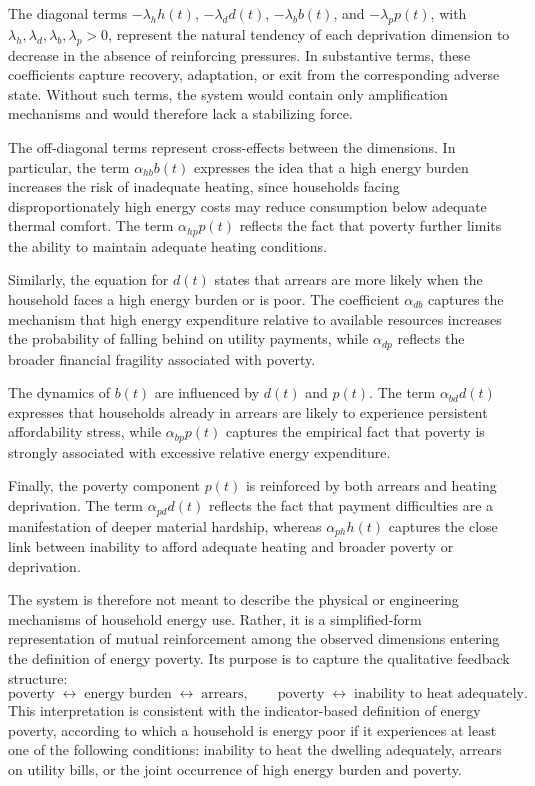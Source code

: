 \documentclass[11pt,a4paper]{article}
\begin{document}
The diagonal terms \(-\lambda_h h(t)\), \(-\lambda_d d(t)\), \(-\lambda_b b(t)\), and \(-\lambda_p p(t)\), with \(\lambda_h,\lambda_d,\lambda_b,\lambda_p>0\), represent the natural tendency of each deprivation dimension to decrease in the absence of reinforcing pressures. In substantive terms, these coefficients capture recovery, adaptation, or exit from the corresponding adverse state. Without such terms, the system would contain only amplification mechanisms and would therefore lack a stabilizing force.

The off-diagonal terms represent cross-effects between the dimensions. In particular, the term
\(\alpha_{hb} b(t)\) expresses the idea that a high energy burden increases the risk of inadequate heating, since households facing disproportionately high energy costs may reduce consumption below adequate thermal comfort. The term \(\alpha_{hp} p(t)\) reflects the fact that poverty further limits the ability to maintain adequate heating conditions.

Similarly, the equation for \(d(t)\) states that arrears are more likely when the household faces a high energy burden or is poor. The coefficient \(\alpha_{db}\) captures the mechanism that high energy expenditure relative to available resources increases the probability of falling behind on utility payments, while \(\alpha_{dp}\) reflects the broader financial fragility associated with poverty.

The dynamics of \(b(t)\) are influenced by \(d(t)\) and \(p(t)\). The term \(\alpha_{bd} d(t)\) expresses that households already in arrears are likely to experience persistent affordability stress, while \(\alpha_{bp} p(t)\) captures the empirical fact that poverty is strongly associated with excessive relative energy expenditure.

Finally, the poverty component \(p(t)\) is reinforced by both arrears and heating deprivation. The term \(\alpha_{pd} d(t)\) reflects the fact that payment difficulties are a manifestation of deeper material hardship, whereas \(\alpha_{ph} h(t)\) captures the close link between inability to afford adequate heating and broader poverty or deprivation.

The system is therefore not meant to describe the physical or engineering mechanisms of household energy use. Rather, it is a simplified-form representation of mutual reinforcement among the observed dimensions entering the definition of energy poverty. Its purpose is to capture the qualitative feedback structure:
\[
\text{poverty} \;\longleftrightarrow\; \text{energy burden} \;\longleftrightarrow\; \text{arrears},
\qquad
\text{poverty} \;\longleftrightarrow\; \text{inability to heat adequately}.
\]
This interpretation is consistent with the indicator-based definition of energy poverty, according to which a household is energy poor if it experiences at least one of the following conditions: inability to heat the dwelling adequately, arrears on utility bills, or the joint occurrence of high energy burden and poverty.
\end{document}
